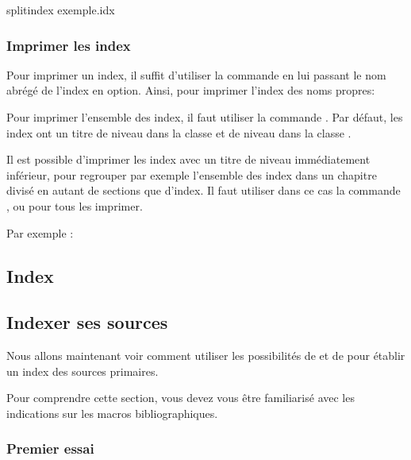 \begin{bashcode}
splitindex exemple.idx
\end{bashcode}

\subsection{Imprimer les index}

Pour imprimer un index, il suffit d'utiliser la commande  en lui passant le nom abrégé de l'index en option. Ainsi, pour imprimer l'index des noms propres:

\begin{latexcode}
\printindex[npr]
\end{latexcode}

Pour imprimer l'ensemble des index, il faut utiliser la commande .
Par défaut, les index ont un titre de niveau  dans la classe  et de niveau  dans la classe .

 Il est possible d'imprimer les index avec un titre de niveau immédiatement inférieur, pour regrouper par exemple  l'ensemble des index dans un chapitre divisé en autant de sections que d'index. Il faut utiliser dans ce cas la commande , ou  pour tous les imprimer.

Par exemple :

\begin{latexcode}
\chapter{Index}
\printsubindex*
\end{latexcode}

\section{Indexer ses sources}


Nous allons maintenant voir comment utiliser les possibilités de  et de  pour établir un index des sources primaires.

Pour comprendre cette section, vous devez vous être familiarisé avec les indications sur les macros bibliographiques.



\subsection{Premier essai}

